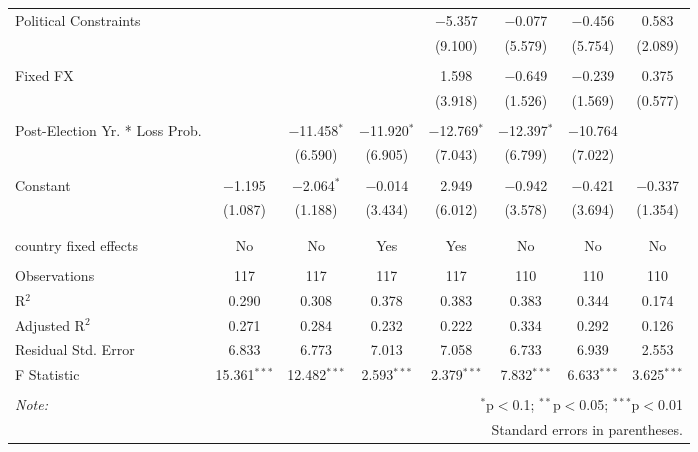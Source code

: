 \begin{tabular}{@{\extracolsep{5pt}}lccccccc}
 Political Constraints &  &  &  & $-$5.357 & $-$0.077 & $-$0.456 & 0.583 \\ 
  &  &  &  & (9.100) & (5.579) & (5.754) & (2.089) \\ 
  & & & & & & & \\ 
 Fixed FX &  &  &  & 1.598 & $-$0.649 & $-$0.239 & 0.375 \\ 
  &  &  &  & (3.918) & (1.526) & (1.569) & (0.577) \\ 
  & & & & & & & \\ 
 Post-Election Yr. * Loss Prob. &  & $-$11.458$^{*}$ & $-$11.920$^{*}$ & $-$12.769$^{*}$ & $-$12.397$^{*}$ & $-$10.764 &  \\ 
  &  & (6.590) & (6.905) & (7.043) & (6.799) & (7.022) &  \\ 
  & & & & & & & \\ 
 Constant & $-$1.195 & $-$2.064$^{*}$ & $-$0.014 & 2.949 & $-$0.942 & $-$0.421 & $-$0.337 \\ 
  & (1.087) & (1.188) & (3.434) & (6.012) & (3.578) & (3.694) & (1.354) \\ 
  & & & & & & & \\ 
\hline \\[-1.8ex] 
country fixed effects & No & No & Yes & Yes & No & No & No \\ 
\hline \\[-1.8ex] 
Observations & 117 & 117 & 117 & 117 & 110 & 110 & 110 \\ 
R$^{2}$ & 0.290 & 0.308 & 0.378 & 0.383 & 0.383 & 0.344 & 0.174 \\ 
Adjusted R$^{2}$ & 0.271 & 0.284 & 0.232 & 0.222 & 0.334 & 0.292 & 0.126 \\ 
Residual Std. Error & 6.833 & 6.773 & 7.013 & 7.058 & 6.733 & 6.939 & 2.553 \\ 
F Statistic & 15.361$^{***}$ & 12.482$^{***}$ & 2.593$^{***}$ & 2.379$^{***}$ & 7.832$^{***}$ & 6.633$^{***}$ & 3.625$^{***}$ \\ 
\hline 
\hline \\[-1.8ex] 
\textit{Note:}  & \multicolumn{7}{r}{$^{*}$p$<$0.1; $^{**}$p$<$0.05; $^{***}$p$<$0.01} \\ 
 & \multicolumn{7}{r}{Standard errors in parentheses.} \\ 
\end{tabular} 
\endgroup 

